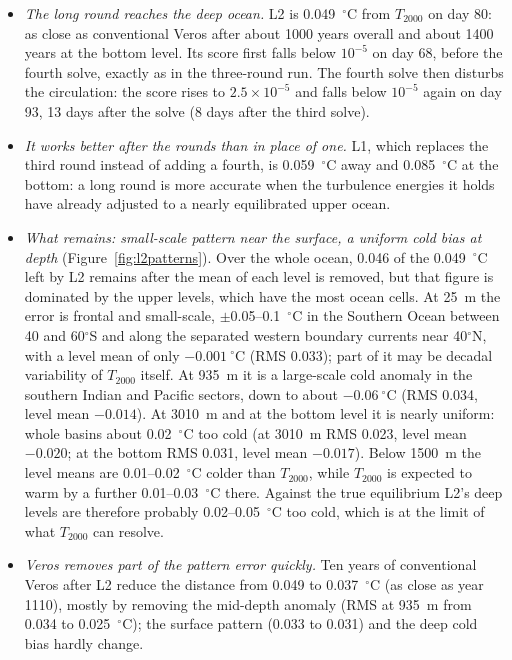 \documentclass{article}
\begin{document}
\begin{itemize}
\item \emph{The long round reaches the deep ocean.} L2 is 0.049~$^\circ$C from $T_{2000}$ on day 80: as close as conventional Veros after about 1000 years overall and about 1400 years at the bottom level. Its score first falls below $10^{-5}$ on day 68, before the fourth solve, exactly as in the three-round run. The fourth solve then disturbs the circulation: the score rises to $2.5\times10^{-5}$ and falls below $10^{-5}$ again on day 93, 13 days after the solve (8 days after the third solve).
\item \emph{It works better after the rounds than in place of one.} L1, which replaces the third round instead of adding a fourth, is 0.059~$^\circ$C away and 0.085~$^\circ$C at the bottom: a long round is more accurate when the turbulence energies it holds have already adjusted to a nearly equilibrated upper ocean.
\item \emph{What remains: small-scale pattern near the surface, a uniform cold bias at depth} (Figure~\ref{fig:l2patterns}). Over the whole ocean, 0.046 of the 0.049~$^\circ$C left by L2 remains after the mean of each level is removed, but that figure is dominated by the upper levels, which have the most ocean cells. At 25~m the error is frontal and small-scale, $\pm$0.05--0.1~$^\circ$C in the Southern Ocean between 40 and 60$^\circ$S and along the separated western boundary currents near 40$^\circ$N, with a level mean of only $-0.001~^\circ$C (RMS 0.033); part of it may be decadal variability of $T_{2000}$ itself. At 935~m it is a large-scale cold anomaly in the southern Indian and Pacific sectors, down to about $-0.06~^\circ$C (RMS 0.034, level mean $-0.014$). At 3010~m and at the bottom level it is nearly uniform: whole basins about 0.02~$^\circ$C too cold (at 3010~m RMS 0.023, level mean $-0.020$; at the bottom RMS 0.031, level mean $-0.017$). Below 1500~m the level means are 0.01--0.02~$^\circ$C colder than $T_{2000}$, while $T_{2000}$ is expected to warm by a further 0.01--0.03~$^\circ$C there. Against the true equilibrium L2's deep levels are therefore probably 0.02--0.05~$^\circ$C too cold, which is at the limit of what $T_{2000}$ can resolve.
\item \emph{Veros removes part of the pattern error quickly.} Ten years of conventional Veros after L2 reduce the distance from 0.049 to 0.037~$^\circ$C (as close as year 1110), mostly by removing the mid-depth anomaly (RMS at 935~m from 0.034 to 0.025~$^\circ$C); the surface pattern (0.033 to 0.031) and the deep cold bias hardly change.
\end{itemize}
\end{document}
